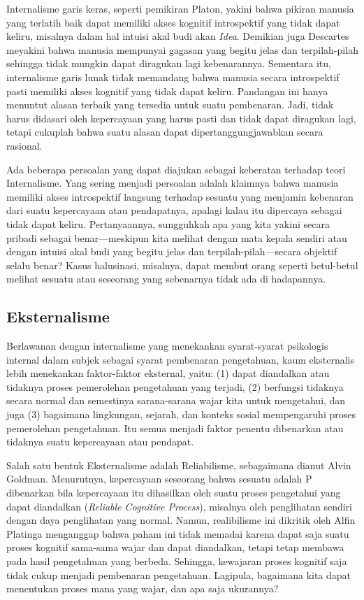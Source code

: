 \documentclass[11pt,twoside,a5paper,openany]{memoir}
\begin{document}
Internalisme garis keras, seperti pemikiran Platon, yakini bahwa pikiran
manusia yang terlatih baik dapat memiliki akses kognitif introspektif
yang tidak dapat keliru, misalnya dalam hal intuisi akal budi akan
\emph{Idea}. Demikian juga Descartes meyakini bahwa manusia mempunyai
gagasan yang begitu jelas dan terpilah-pilah sehingga tidak mungkin
dapat diragukan lagi kebenarannya. Sementara itu, internalisme garis
lunak tidak memandang bahwa manusia secara introspektif pasti memiliki
akses kognitif yang tidak dapat keliru. Pandangan ini hanya menuntut
alasan terbaik yang tersedia untuk suatu pembenaran. Jadi, tidak harus
didasari oleh kepercayaan yang harus pasti dan tidak dapat diragukan
lagi, tetapi cukuplah bahwa suatu alasan dapat dipertanggungjawabkan
secara rasional.

Ada beberapa persoalan yang dapat diajukan sebagai keberatan terhadap
teori Internalisme. Yang sering menjadi persoalan adalah klaimnya bahwa
manusia memiliki akses introspektif langsung terhadap sesuatu yang
menjamin kebenaran dari suatu kepercayaan atau pendapatnya, apalagi
kalau itu dipercaya sebagai tidak dapat keliru. Pertanyaannya,
sungguhkah apa yang kita yakini secara pribadi sebagai benar---meskipun
kita melihat dengan mata kepala sendiri atau dengan intuisi akal budi
yang begitu jelas dan terpilah-pilah---secara objektif selalu benar?
Kasus halusinasi, misalnya, dapat membut orang seperti betul-betul
melihat sesuatu atau seseorang yang sebenarnya tidak ada di hadapannya.

\hypertarget{eksternalisme}{%
\subsection{Eksternalisme}\label{eksternalisme}}

Berlawanan dengan internalisme yang menekankan syarat-syarat psikologis
internal dalam subjek sebagai syarat pembenaran pengetahuan, kaum
eksternalis lebih menekankan faktor-faktor eksternal, yaitu: (1) dapat
diandalkan atau tidaknya proses pemerolehan pengetahuan yang terjadi,
(2) berfungsi tidaknya secara normal dan semestinya sarana-sarana wajar
kita untuk mengetahui, dan juga (3) bagaimana lingkungan, sejarah, dan
konteks sosial mempengaruhi proses pemerolehan pengetahuan. Itu semua
menjadi faktor penentu dibenarkan atau tidaknya suatu kepercayaan atau
pendapat.

Salah satu bentuk Eksternalisme adalah Reliabilisme, sebagaimana dianut
Alvin Goldman. Menurutnya, kepercayaan seseorang bahwa sesuatu adalah P
dibenarkan bila kepercayaan itu dihasilkan oleh suatu proses pengetahui
yang dapat diandalkan (\emph{Reliable Cognitive Process}), misalnya oleh
penglihatan sendiri dengan daya penglihatan yang normal. Namun,
realibilisme ini dikritik oleh Alfin Platinga menganggap bahwa paham ini
tidak memadai karena dapat saja suatu proses kognitif sama-sama wajar
dan dapat diandalkan, tetapi tetap membawa pada hasil pengetahuan yang
berbeda. Sehingga, kewajaran proses kognitif saja tidak cukup menjadi
pembenaran pengetahuan. Lagipula, bagaimana kita dapat menentukan proses
mana yang wajar, dan apa saja ukurannya?
\end{document}
